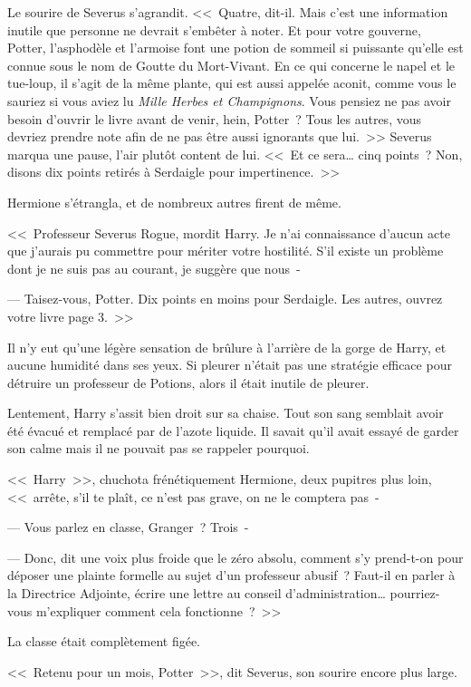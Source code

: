 Le sourire de Severus s'agrandit. <<~Quatre, dit-il. Mais c'est une information inutile que personne ne devrait s'embêter à noter. Et pour votre gouverne, Potter, l'asphodèle et l'armoise font une potion de sommeil si puissante qu'elle est connue sous le nom de Goutte du Mort-Vivant. En ce qui concerne le napel et le tue-loup, il s'agit de la même plante, qui est aussi appelée aconit, comme vous le sauriez si vous aviez lu \emph{Mille Herbes et Champignons}. Vous pensiez ne pas avoir besoin d'ouvrir le livre avant de venir, hein, Potter~? Tous les autres, vous devriez prendre note afin de ne pas être aussi ignorants que lui.~>> Severus marqua une pause, l'air plutôt content de lui. <<~Et ce sera… cinq points~? Non, disons dix points retirés à Serdaigle pour impertinence.~>>

Hermione s'étrangla, et de nombreux autres firent de même.

<<~Professeur Severus Rogue, mordit Harry. Je n'ai connaissance d'aucun acte que j'aurais pu commettre pour mériter votre hostilité. S'il existe un problème dont je ne suis pas au courant, je suggère que nous~-

--- Taisez-vous, Potter. Dix points en moins pour Serdaigle. Les autres, ouvrez votre livre page 3.~>>

Il n'y eut qu'une légère sensation de brûlure à l'arrière de la gorge de Harry, et aucune humidité dans ses yeux. Si pleurer n'était pas une stratégie efficace pour détruire un professeur de Potions, alors il était inutile de pleurer.

Lentement, Harry s'assit bien droit sur sa chaise. Tout son sang semblait avoir été évacué et remplacé par de l'azote liquide. Il savait qu'il avait essayé de garder son calme mais il ne pouvait pas se rappeler pourquoi.

<<~Harry~>>, chuchota frénétiquement Hermione, deux pupitres plus loin, <<~arrête, s'il te plaît, ce n'est pas grave, on ne le comptera pas~-

--- Vous parlez en classe, Granger~? Trois~-

--- Donc, dit une voix plus froide que le zéro absolu, comment s'y prend-t-on pour déposer une plainte formelle au sujet d'un professeur abusif~? Faut-il en parler à la Directrice Adjointe, écrire une lettre au conseil d'administration… pourriez-vous m'expliquer comment cela fonctionne~?~>>

La classe était complètement figée.

<<~Retenu pour un mois, Potter~>>, dit Severus, son sourire encore plus large.


